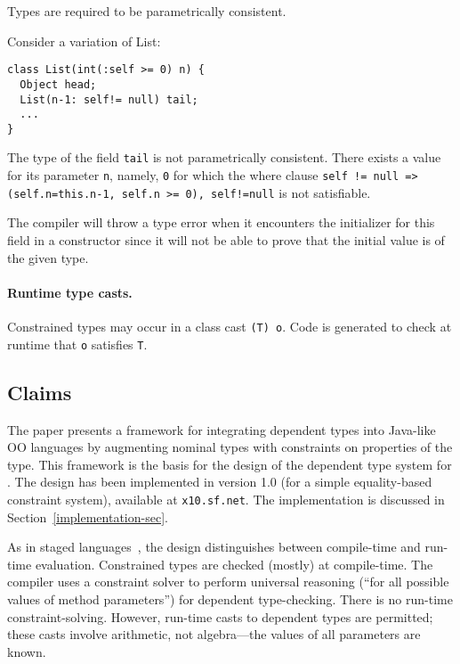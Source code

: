 Types are required to be parametrically consistent.

\begin{example} Consider  a variation of List:
{\footnotesize
\begin{verbatim}
class List(int(:self >= 0) n) {
  Object head;
  List(n-1: self!= null) tail;
  ...
}
\end{verbatim}}
The type of the field {\tt tail} is not parametrically
consistent. There exists a value for its parameter {\tt n}, namely,
{\tt 0} for which the where clause {\tt self != null =>
(self.n=this.n-1, self.n >= 0), self!=null} is not satisfiable.

The compiler will throw a type error when it encounters the
initializer for this field in a constructor since it will not be able
to prove that the initial value is of the given type.

\end{example}

\paragraph{Runtime type casts.} 
Constrained types may occur in a class cast {\tt (T) o}.  Code is
generated to check at runtime that {\tt o} satisfies {\tt T}.


\subsection{Claims}
The paper presents a framework for integrating dependent types into
Java-like OO languages by augmenting nominal types with constraints on
properties of the type. This framework is the basis for the design of
the dependent type system for \Xten{}. The design has been implemented
in \Xten{} version 1.0 (for a simple equality-based constraint
system), available at {\tt x10.sf.net}.  The implementation is discussed in Section~\ref{implementation-sec}.

As in staged languages~\cite{nielson-multistage,ts97-multistage}, the
design distinguishes between compile-time and run-time
evaluation. Constrained types are checked (mostly) at compile-time.
The compiler uses a constraint solver to perform universal reasoning
(``for all possible values of method parameters'') for dependent
type-checking.  There is no run-time constraint-solving.  However,
run-time casts to dependent types are permitted; these casts involve
arithmetic, not algebra---the values of all parameters are known.

